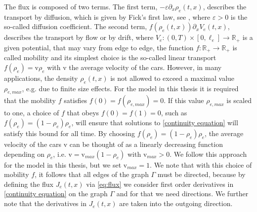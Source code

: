 The flux is composed of two terms. The first term, $- \varepsilon \partial_x \rho_e (t, x)$, describes the transport by diffusion, which is given by Fick's first law, see \cite{Fick:1855}, where $\varepsilon > 0$ is the so-called diffusion coefficient. The second term, $f(\rho_e(t, x)) \partial_x V_e(t, x)$, describes the transport by flow or by drift, where $V_e \colon (0,T) \times [0, \ell_e] \to \mathbb{R}_{+}$ is a given potential, that may vary from edge to edge, the function $f \colon \mathbb{R}_{+} \to \mathbb{R}_{+}$ is called mobility and its simplest choice is the so-called linear transport $f(\rho_e) = \mathrm{v} \rho_e$ with $\mathrm{v}$ the average velocity of the cars. However, in many applications, the density $\rho_e (t,x)$ is not allowed to exceed a maximal value $\rho_{e, max}$, e.g. due to finite size effects. For the model in this thesis it is required that the mobility $f$ satisfies $f(0) = f(\rho_{e, max}) = 0$. If this value $\rho_{e, max}$ is scaled to one, a choice of $f$ that obeys $f(0) = f(1) = 0$, such as $f(\rho_e) = (1-\rho_e) \rho_e$, will ensure that solutions to \eqref{continuity equation} will satisfy this bound for all time. By choosing $f(\rho_e) = (1-\rho_e) \rho_e$, the average velocity of the cars $\mathrm{v}$ can be thought of as a linearly decreasing function depending on $\rho_e$, i.e. $\mathrm{v} = \mathrm{v}_{max} (1-\rho_e)$ with $\mathrm{v}_{max} > 0$. We follow this approach for the model in this thesis, but we set $\mathrm{v}_{max} = 1$. We note that with this choice of mobility $f$, it follows that all edges of the graph $\Gamma$ must be directed, because by defining the flux $J_e(t,x)$ via \cref{eq:flux} we consider first order derivatives in \cref{continuity equation} on the graph $\Gamma$ and for that  we need directions. We further note that the derivatives in $J_e(t,x)$ are taken into the outgoing direction. \\

